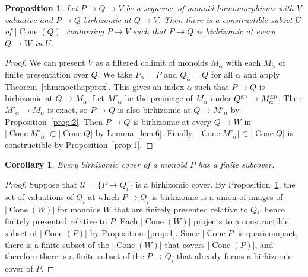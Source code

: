 \documentclass[10pt]{article}
\numberwithin{equation}{section}
\newtheorem{proposition}[paragraph]{Proposition}
\newtheorem{corollary}[paragraph]{Corollary}
\theoremstyle{definition}
\theoremstyle{remark}
\def\Cone{\operatorname{Cone}}
\def\cone{\Cone}
\newcommand{\utopcone}[1]{\left\vert\Cone #1 \right\vert}
\begin{document}
\begin{proposition} \label{prop:11}
	Let $P \to Q \to V$ be a sequence of monoid homomorphisms with $V$ valuative and $P \to Q$ birhizomic at $Q \to V$.  Then there is a 
	constructible subset $U$ of $\lvert\Cone(Q)\rvert$ containing $P \to V$ such that $P \to Q$ is birhizomic at every $Q \to W$ in $U$.
\end{proposition}




\begin{proof}
	We can present $V$ as a filtered colimit of monoids $M_\alpha$ with each $M_\alpha$ of finite presentation over $Q$.  We take $P_\alpha = P$ and $Q_\alpha = Q$ for all $\alpha$ and apply Theorem~\ref{thm:noethapprox}.  This gives an index $\alpha$ such that $P \to Q$ is birhizomic at $Q \to M_\alpha$.  Let $M'_\alpha$ be the pre\"image of $M_\alpha$ under $Q^{\rm gp}  \to M_\alpha^{\rm gp}$.  Then $M'_\alpha \to M_\alpha$ is exact, so $P \to Q$ is also birhizomic at $Q \to M'_\alpha$ by Proposition~\ref{prop:2}.  Then $P \to Q$ is birhizomic at every $Q \to W$ in $\utopcone{ M'_\alpha} \subset \utopcone{Q}$ by Lemma~\ref{lem:6}.  Finally, $\utopcone{M'_\alpha} \subset \utopcone{Q}$ is 
	constructible by Proposition~\ref{prop:1}.
\end{proof}






\begin{corollary} \label{cor:5}
	Every birhizomic cover of a monoid $P$ has a finite subcover.
\end{corollary}
\begin{proof}
	Suppose that $\mathcal U = \{ P \to Q_i \}$ is a birhizomic cover.  By Proposition~\ref{prop:11}, the set of valuations of $Q_i$ at which $P \to Q_i$ is birhizomic is a union of images of $\lvert \Cone(W) \rvert$ for monoids $W$ that are finitely presented relative to $Q_i$, hence finitely presented relative to $P$.  Each $\lvert \Cone(W) \rvert$ projects to a 
	constructible subset of $\lvert \Cone(P) \rvert$ by Proposition~\ref{prop:1}.  Since $\lvert \cone P \rvert$ is quasicompact, there is a finite subset of the $\lvert \Cone(W) \rvert$ that covers $\lvert \Cone(P) \rvert$, and therefore there is a finite subset of the $P \to Q_i$ that already forms a birhizomic cover of $P$.
\end{proof}
\end{document}
